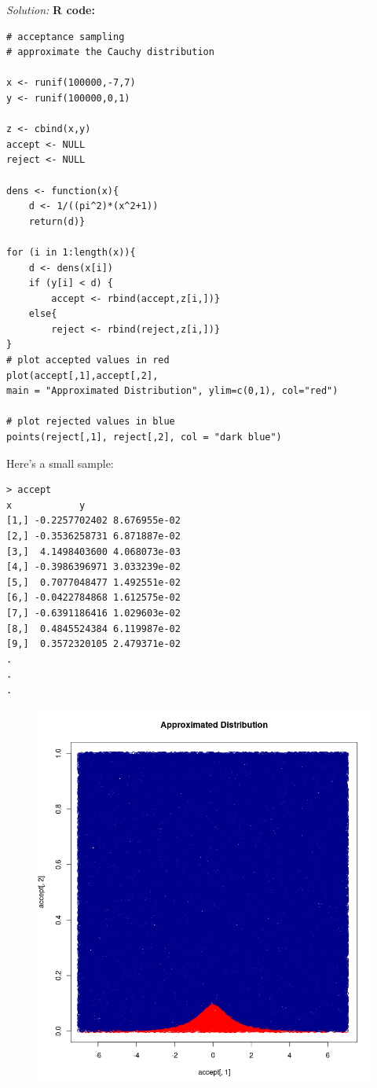\documentclass{book}
\theoremstyle{definition}
\begin{document}
\noindent \textit{Solution:}  \textbf{R code:}
\begin{lstlisting}
# acceptance sampling
# approximate the Cauchy distribution

x <- runif(100000,-7,7)
y <- runif(100000,0,1)

z <- cbind(x,y)
accept <- NULL
reject <- NULL

dens <- function(x){
	d <- 1/((pi^2)*(x^2+1))
	return(d)}

for (i in 1:length(x)){
	d <- dens(x[i])
	if (y[i] < d) {
		accept <- rbind(accept,z[i,])}
	else{
		reject <- rbind(reject,z[i,])}
}
# plot accepted values in red
plot(accept[,1],accept[,2], 
main = "Approximated Distribution", ylim=c(0,1), col="red")

# plot rejected values in blue
points(reject[,1], reject[,2], col = "dark blue")
\end{lstlisting}

Here's a small sample:
\begin{lstlisting}
> accept
x            y
[1,] -0.2257702402 8.676955e-02
[2,] -0.3536258731 6.871887e-02
[3,]  4.1498403600 4.068073e-03
[4,] -0.3986396971 3.033239e-02
[5,]  0.7077048477 1.492551e-02
[6,] -0.0422784868 1.612575e-02
[7,] -0.6391186416 1.029603e-02
[8,]  0.4845524384 6.119987e-02
[9,]  0.3572320105 2.479371e-02
.
.
.
\end{lstlisting}

\newpage


\begin{figure}[!htb]
	\centering
	\includegraphics[scale=0.6]{Cauchy}
\end{figure}
\end{document}
